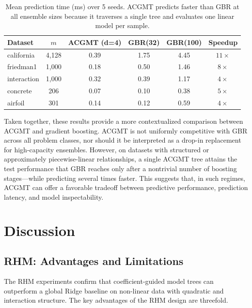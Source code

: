 \documentclass[11pt,a4paper]{article}
\begin{document}
\begin{table}[ht]
\centering
\caption{Mean prediction time (ms) over 5 seeds. ACGMT predicts faster than GBR at all ensemble sizes because it traverses a single tree and evaluates one linear model per sample.}\label{tab:predict_time}
\begin{tabular}{lccccc}
\toprule
\textbf{Dataset} & \textbf{$m$} & \textbf{ACGMT (d=4)} & \textbf{GBR(32)} & \textbf{GBR(100)} & \textbf{Speedup} \\
\midrule
california  & 4,128 & 0.39 & 1.75 & 4.45 & $11\times$ \\
friedman1   & 1,000 & 0.18 & 0.50 & 1.46 & $8\times$ \\
interaction & 1,000 & 0.32 & 0.39 & 1.17 & $4\times$ \\
concrete    & 206   & 0.07 & 0.10 & 0.38 & $5\times$ \\
airfoil     & 301   & 0.14 & 0.12 & 0.59 & $4\times$ \\
\bottomrule
\end{tabular}
\end{table}

Taken together, these results provide a more contextualized comparison between ACGMT and gradient boosting. ACGMT is not uniformly competitive with GBR across all problem classes, nor should it be interpreted as a drop-in replacement for high-capacity ensembles. However, on datasets with structured or approximately piecewise-linear relationships, a single ACGMT tree attains the test performance that GBR reaches only after a nontrivial number of boosting stages---while predicting several times faster. This suggests that, in such regimes, ACGMT can offer a favorable tradeoff between predictive performance, prediction latency, and model inspectability.


\section{Discussion}\label{sec:discussion}

\subsection{RHM: Advantages and Limitations}

The RHM experiments confirm that coefficient-guided model trees can outperform a global Ridge baseline on non-linear data with quadratic and interaction structure. The key advantages of the RHM design are threefold.
\end{document}
